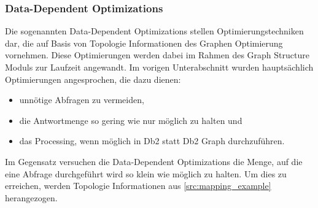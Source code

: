 \subsubsection{Data-Dependent Optimizations}

Die sogenannten Data-Dependent Optimizations stellen Optimierungstechniken dar, die auf Basis von Topologie Informationen des Graphen Optimierung vornehm\-en. Diese Optimierungen werden dabei im Rahmen des Graph Structure Moduls zur Laufzeit angewandt. Im vorigen Unterabschnitt  wurden hauptsächlich Optimierungen angesprochen, die dazu dienen:
\begin{itemize}
    \item unnötige Abfragen zu vermeiden, 
    \item die Antwortmenge so gering wie nur möglich zu halten und 
    \item das Processing, wenn möglich in Db2 statt Db2 Graph durchzuführen.  
\end{itemize}
Im Gegensatz versuchen die Data-Dependent Optimizations die Menge, auf die eine Abfrage durchgeführt wird so klein wie möglich zu halten. Um dies zu erreichen, werden Topologie Informationen aus \autoref{src:mapping_example} herangezogen.

